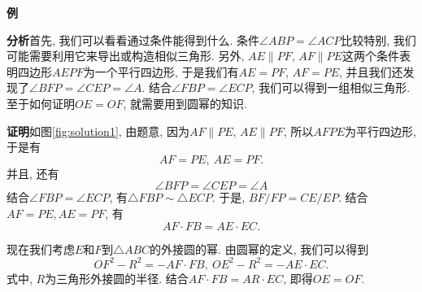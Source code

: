 \documentclass{book}
\begin{document}
\begin{paracol}{2}
\begin{tcolorbox}
\textbf{例}
\end{tcolorbox}

\textbf{分析}\quad 首先, 我们可以看看通过条件能得到什么. 条件$\angle ABP=\angle ACP$比较特别, 我们可能需要利用它来导出或构造相似三角形. 另外, $AE\parallel PF$, $AF\parallel PE$这两个条件表明四边形$AEPF$为一个平行四边形, 于是我们有$AE=PF$, $AF=PE$, 并且我们还发现了$\angle BFP=\angle CEP=\angle A$. 结合$\angle FBP=\angle ECP$, 我们可以得到一组相似三角形. 至于如何证明$OE=OF$, 就需要用到圆幂的知识.\par

\textbf{证明}\quad 如图\ref{fig:solution1}, 由题意, 因为$AF\parallel PE$, $AE\parallel PF$, 所以$AFPE$为平行四边形, 于是有
\[AF=PE,\ AE=PF.\]
并且, 还有
\[\angle BFP=\angle CEP=\angle A\]
结合$\angle FBP=\angle ECP$, 有$\triangle FBP\sim\triangle ECP$. 于是, $BF/FP=CE/EP$.
结合$AF=PE, AE=PF$, 有
\[AF\cdot FB=AE\cdot EC.\]\par
现在我们考虑$E$和$F$到$\triangle ABC$的外接圆的幂. 由圆幂的定义, 我们可以得到
\[OF^2-R^2=-AF\cdot FB,\ OE^2-R^2=-AE\cdot EC.\]
式中, $R$为三角形外接圆的半径. 结合$AF\cdot FB=AR\cdot EC$, 即得$OE=OF$.


\end{paracol}
\end{document}
